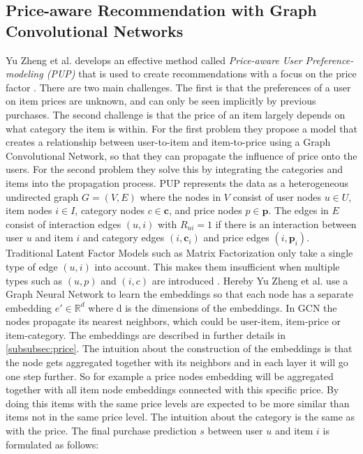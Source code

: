 \subsection{Price-aware Recommendation with Graph Convolutional Networks}\label{subsec:price-intro}
Yu Zheng et al. develops an effective method called \textit{Price-aware User Preference-modeling (PUP)} that is used to create recommendations with a focus on the price factor \cite{Priceaware}.
There are two main challenges.
The first is that the preferences of a user on item prices are unknown, and can only be seen implicitly by previous purchases.
The second challenge is that the price of an item largely depends on what category the item is within.
For the first problem they propose a model that creates a relationship between user-to-item and item-to-price using a Graph Convolutional Network, so that they can propagate the influence of price onto the users.
For the second problem they solve this by integrating the categories and items into the propagation process.
PUP represents the data as a heterogeneous undirected graph $G = (V,E)$ where the nodes in $V$ consist of user nodes $u \in U$, item nodes $i \in I$, category nodes $c \in \textbf{c}$, and price nodes $p \in \textbf{p}$.
The edges in $E$ consist of interaction edges $(u, i)$ with $R_{ui} = 1$ if there is an interaction between user $u$ and item $i$ and category edges $(i, \textbf{c}_i)$ and price edges $(i, \textbf{p}_i)$.
Traditional Latent Factor Models such as Matrix Factorization only take a single type of edge $(u, i)$ into account.
This makes them insufficient when multiple types such as $(u, p)$ and $(i, c)$ are introduced \cite{Priceaware}.
Hereby Yu Zheng et al. use a Graph Neural Network to learn the embeddings so that each node has a separate embedding $e' \in \mathbb{R}^d$ where d is the dimensions of the embeddings.
In GCN the nodes propagate its nearest neighbors, which could be user-item, item-price or item-category.
The embeddings are described in further details in \autoref{subsubsec:price}.
The intuition about the construction of the embeddings is that the node gets aggregated together with its neighbors and in each layer it will go one step further.
So for example a price nodes embedding will be aggregated together with all item node embeddings connected with this specific price.
By doing this items with the same price levels are expected to be more similar than items not in the same price level.
The intuition about the category is the same as with the price.
The final purchase prediction $s$ between user $u$ and item $i$ is formulated as follows:
